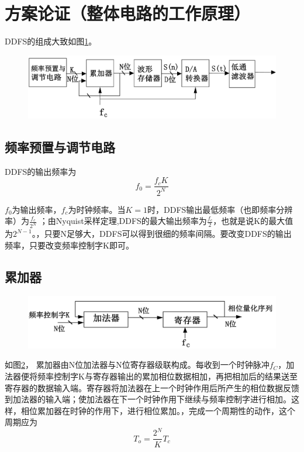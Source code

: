 \documentclass[12pt]{article}
\begin{document}
\section{方案论证（整体电路的工作原理）}
DDFS的组成大致如图\ref{fig:yuanli}。\par
\begin{figure}[htbp]%
	\centering  %
	\includegraphics[width=\textwidth]{picture/yuanli.png}  %
	\caption{}  %
	\label{fig:yuanli}   %
\end{figure}
\subsection{频率预置与调节电路}
DDFS的输出频率为$$f_0=\frac{f_c K}{2^N}$$ \par
$f_0$为输出频率，$f_c$为时钟频率。当$K=1$时，DDFS输出最低频率（也即频率分辨率）为$\frac{f_c}{2^N}$ ；由Nyquist采样定理,DDFS的最大输出频率为$\frac{f_c}{2}$，也就是说K的最大值为$2^{N-1}$。，只要N足够大，DDFS可以得到很细的频率间隔。要改变DDFS的输出频率，只要改变频率控制字K即可。
\subsection{累加器}
\begin{figure}[htbp]
	\centering  
	\includegraphics[width=\textwidth]{picture/yuanli2.png}  
	\caption{}  
	\label{fig:yuanli2}   
\end{figure}
如图\ref{fig:yuanli2}，
累加器由N位加法器与N位寄存器级联构成。每收到一个时钟脉冲$f_C$，加法器便将频率控制字K与寄存器输出的累加相位数据相加，再把相加后的结果送至寄存器的数据输入端。寄存器将加法器在上一个时钟作用后所产生的相位数据反馈到加法器的输入端；使加法器在下一个时钟作用下继续与频率控制字进行相加。这样，相位累加器在时钟的作用下，进行相位累加。，完成一个周期性的动作，这个周期应为$$T_o=\frac{2^N}{K} T_c$$
\end{document}
